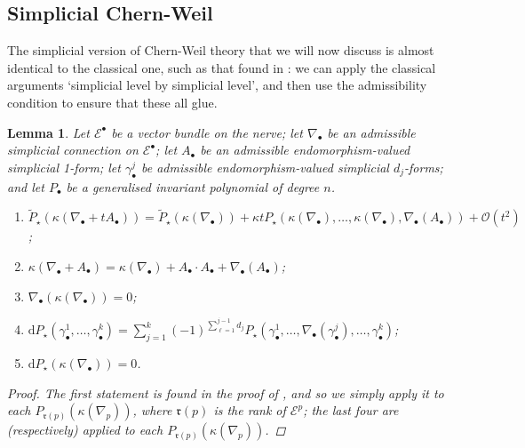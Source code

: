 \documentclass[11pt,fleqn]{article}
\theoremstyle{plain}
\newtheorem{lemma}[theorem]{Lemma}
\theoremstyle{definition}
\theoremstyle{remark}
\numberwithin{equation}{theorem}
\newcommand{\OO}{\mathcal{O}}
\newcommand{\anotherbullet}{\star}
\renewcommand{\d}{\mathrm{d}}
\begin{document}
    \subsection{Simplicial Chern-Weil}\label{subsection:simplicial-chern-weil}

        The simplicial version of Chern-Weil theory that we will now discuss is almost identical to the classical one, such as that found in \cite[§4.4]{Huybrechts2005}: we can apply the classical arguments `simplicial level by simplicial level', and then use the admissibility condition to ensure that these all glue.

        \begin{lemma}\label{lemma:chern-weil-lemmas}
            Let $\mathcal{E}^\bullet$ be a vector bundle on the nerve; let $\nabla_\bullet$ be an admissible simplicial connection on $\mathcal{E}^\bullet$; let $A_\bullet$ be an admissible endomorphism-valued simplicial 1-form; let $\gamma_\bullet^j$ be admissible endomorphism-valued simplicial $d_j$-forms; and let $P_\bullet$ be a generalised invariant polynomial of degree $n$.
            \begin{enumerate}
                \item $\widetilde{P}_\anotherbullet(\kappa(\nabla_\bullet + t A_\bullet)) = \widetilde{P}_\anotherbullet(\kappa(\nabla_\bullet)) + \kappa t P_\anotherbullet(\kappa(\nabla_\bullet),\ldots,\kappa(\nabla_\bullet),\nabla_\bullet(A_\bullet)) + \OO(t^2)$;
                \item $\kappa(\nabla_\bullet + A_\bullet) = \kappa(\nabla_\bullet) + A_\bullet\cdot A_\bullet + \nabla_\bullet(A_\bullet)$;
                \item $\nabla_\bullet(\kappa(\nabla_\bullet)) = 0$;
                \item $\d P_\anotherbullet(\gamma_\bullet^1,\ldots,\gamma_\bullet^k) = \sum_{j=1}^k (-1)^{\sum_{\ell=1}^{j-1}d_j} P_\anotherbullet(\gamma_\bullet^1,\ldots,\nabla_\bullet(\gamma_\bullet^j),\ldots,\gamma_\bullet^k)$;
                \item $\d P_\anotherbullet(\kappa(\nabla_\bullet)) = 0$.
            \end{enumerate}

            \begin{proof}
                The first statement is found in the proof of \cite[Lemma~4.4.6]{Huybrechts2005}, and so we simply apply it to each $P_{\mathfrak{r}(p)}(\kappa(\nabla_p))$, where $\mathfrak{r}(p)$ is the rank of $\mathcal{E}^p$; the last four are \cite[Lemma~4.3.4,Lemma~4.3.5,Lemma~4.4.4,Corollary~4.4.5]{Huybrechts2005} (respectively) applied to each $P_{\mathfrak{r}(p)}(\kappa(\nabla_p))$.
            \end{proof}
        \end{lemma}
\end{document}
